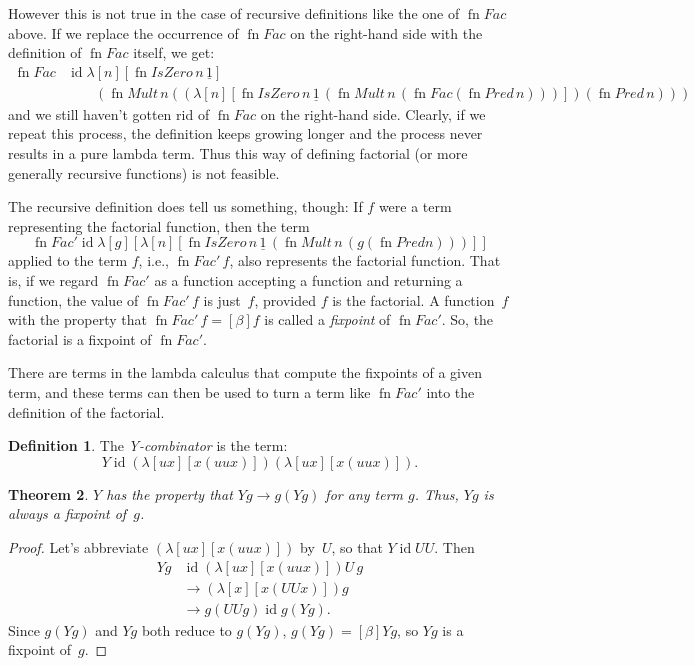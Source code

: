 \documentclass[10pt,a4paper]{article}
\theoremstyle{plain}
\newtheorem{thm}{Theorem}[section]
\theoremstyle{definition}
\newtheorem{defn}[thm]{Definition}
\theoremstyle{remark}
\newcommand*{\ollabel}[1]{\label{#1}}
\providecommand{\num}[1]{\underline{#1}}
\providecommand{\lambd}{\ensuremath{\lambda}}
\providecommand{\ident}{\operatorname{id}}
\providecommand{\red}{\mathrel{\rightarrow}}
\providecommand{\fn}{\operatorname{fn}}
\begin{document}
However this is not true in the case of recursive definitions like the
one of $\fn{Fac}$ above. If we replace the occurrence of $\fn{Fac}$ on
the right-hand side with the definition of $\fn{Fac}$ itself, we get:
\begin{align*}
  \fn{Fac} & \ident \lambd[n][\fn{IsZero}\, n\, \num{1}] \\
    & \qquad (\fn{Mult}\, n
  ((\lambd[n][\fn{IsZero} \, n \, \num 1\, (\fn{Mult}\, n\, (\fn{Fac}
    (\fn{Pred}\, n)))]) (\fn{Pred}\, n)))
\end{align*}
and we still haven't gotten rid of $\fn{Fac}$ on the right-hand
side. Clearly, if we repeat this process, the definition keeps growing
longer and the process never results in a pure lambda term. Thus this
way of defining factorial (or more generally recursive functions)
is not feasible.

The recursive definition does tell us something, though: If $f$ were a
term representing the factorial function, then the term
\[
\fn{Fac}' \ident \lambd[g][\lambd[n][\fn{IsZero} \, n \, \num 1\, (\fn{Mult} \, n\, (g (\fn{Pred} n)))]]
\]
applied to the term $f$, i.e., $\fn{Fac}'\,f$, also represents the
factorial function.  That is, if we regard $\fn{Fac}'$ as a function
accepting a function and returning a function, the value of
$\fn{Fac'}\, f$ is just~$f$, provided $f$ is the factorial. A
function~$f$ with the property that $\fn{Fac}' \, f \equal[\beta] f$ is called
a \emph{fixpoint} of $\fn{Fac}'$. So, the factorial is a fixpoint of
$\fn{Fac}'$.

There are terms in the lambda calculus that compute the fixpoints of a
given term, and these terms can then be used to turn a term like
$\fn{Fac}'$ into the definition of the factorial. 

\begin{defn}
  \ollabel{defn:Turing-Y}
  The \emph{Y-combinator} is the term:
  \[
  Y \ident (\lambd[ux][x(uux)])(\lambd[ux][x(uux)]).
  \]
\end{defn}

\begin{thm}
  $Y$ has the property that $Yg \red g(Yg)$ for any term $g$. Thus,
  $Yg$ is always a fixpoint of~$g$.
\end{thm}

\begin{proof}
  Let's abbreviate $(\lambd[ux][x(uux)])$ by~$U$, so that $Y \ident UU$. Then
  \begin{align*}
    Y g &\ident (\lambd[ux][x(uux)])U\,g \\
    &\red (\lambd[x][x(UUx)])g\\
    & \red g(UUg) \ident g(Yg).
  \end{align*}
  Since $g(Yg)$ and $Yg$ both reduce to $g(Yg)$, $g(Yg) \equal[\beta]
  Yg$, so $Yg$ is a fixpoint of~$g$.
\end{proof}
\end{document}
